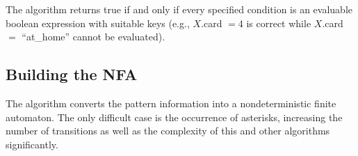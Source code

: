 The algorithm  returns true if and only if every specified condition is an evaluable boolean expression with suitable keys (e.g., $X$.card $=4$ is correct while $X$.card $=$ ``at\_home'' cannot be evaluated).

\begin{algorithm}
  \caption{\label{alg:verifyConditions}}
    \Return {}\;
\end{algorithm}

\subsection{Building the NFA}
The algorithm  converts the pattern information into a nondeterministic finite automaton. The only difficult case is the occurrence of asterisks, increasing the number of transitions as well as the complexity of this and other algorithms significantly.

